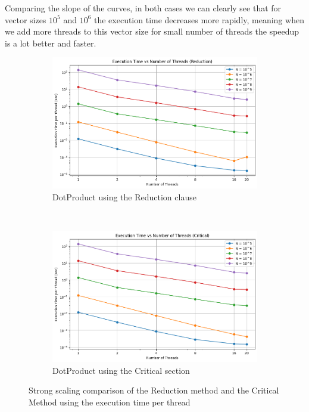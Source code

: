 Comparing the slope of the curves, in both cases we can clearly see that for vector sizes $10^5$ and $10^6$ the execution time decreases more rapidly, meaning when we add more threads to this vector size for small number of threads the speedup is a lot better and faster.
\begin{figure}[H]
    \centering
    \begin{subfigure}[b]{\textwidth}
        \centering
        \includegraphics[width=\textwidth]{../media/execution_red.png}
        \caption{DotProduct using the Reduction clause}
        \label{fig:image1}
    \end{subfigure}
    \hfill \\
    \begin{subfigure}[b]{\textwidth}
        \centering
        \includegraphics[width=\textwidth]{../media/execution_crit.png}
        \caption{DotProduct using the Critical section}
        \label{fig:image2}
    \end{subfigure}
    \caption{Strong scaling comparison of the Reduction method and the Critical Method using the execution time per thread}
    \label{fig:scale}
\end{figure}
 
